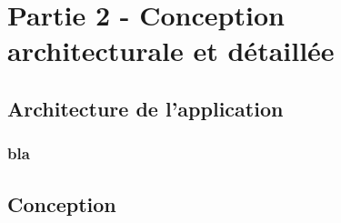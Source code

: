 \chapter{Partie 2 - Conception architecturale et détaillée}

\section{Architecture de l'application}

\subsection{bla}

\section{Conception}
